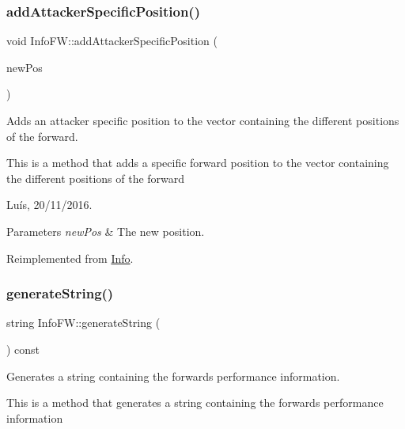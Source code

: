 \subsubsection{\texorpdfstring{add\+Attacker\+Specific\+Position()}{addAttackerSpecificPosition()}}
{\footnotesize\ttfamily void Info\+F\+W\+::add\+Attacker\+Specific\+Position (\begin{DoxyParamCaption}\item[{\hyperlink{_utils_8hpp_ae6ffae6f01bd3312aac4a44642f14620}{Forward\+Position}}]{new\+Pos }\end{DoxyParamCaption})\hspace{0.3cm}{\ttfamily [virtual]}}



Adds an attacker specific position to the vector containing the different positions of the forward. 

This is a method that adds a specific forward position to the vector containing the different positions of the forward

Luís, 20/11/2016. 


\begin{DoxyParams}{Parameters}
{\em new\+Pos} & The new position. \\
\hline
\end{DoxyParams}


Reimplemented from \hyperlink{class_info_afba094a1c19e8ff4bb3a9048ca6c7f4a}{Info}.

\hypertarget{class_info_f_w_a4c5957205aa850fcdc1d6ba30f085543}{}\label{class_info_f_w_a4c5957205aa850fcdc1d6ba30f085543} 
\subsubsection{\texorpdfstring{generate\+String()}{generateString()}}
{\footnotesize\ttfamily string Info\+F\+W\+::generate\+String (\begin{DoxyParamCaption}{ }\end{DoxyParamCaption}) const\hspace{0.3cm}{\ttfamily [virtual]}}



Generates a string containing the forward\textquotesingle{}s performance information. 

This is a method that generates a string containing the forward\textquotesingle{}s performance information

